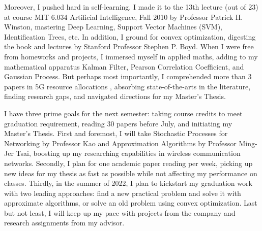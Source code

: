 \documentclass[12pt, a4paper, onside]{article}
\begin{document}
Moreover, I pushed hard in self-learning. I made it to the 13th lecture (out of 23) at course MIT 6.034 Artificial Intelligence, Fall 2010 by Professor Patrick H. Winston, mastering Deep Learning, Support Vector Machines (SVM), Identification Trees, etc. In addition, I ground for convex optimization, digesting the book and lectures by Stanford Professor Stephen P. Boyd. When I were free from homeworks and projects, I immersed myself in applied maths, adding to my mathematical apparatus Kalman Filter, Pearson Correlation Coefficient, and Gaussian Process. But perhaps most importantly, I comprehended more than 3 papers in 5G resource allocations \cite{5gJointThreshold, 5gJointACM, 5gQoS, 5gNoma}, absorbing state-of-the-arts in the literature, finding research gaps, and navigated directions for my Master's Thesis.

I have three prime goals for the next semester: taking course credits to meet graduation requirement, reading 30 papers before July, and initiating my Master's Thesis. First and foremost, I will take Stochastic Processes for Networking by Professor Kao and Approximation Algorithms by Professor Ming-Jer Tsai, boosting up my researching capabilities in wireless communication networks. Secondly, I plan for one academic paper reading per week, picking up new ideas for my thesis as fast as possible while not affecting my performance on classes. Thirdly, in the summer of 2022, I plan to kickstart my graduation work with two leading approaches: find a new practical problem and solve it with approximate algorithms, or solve an old problem using convex optimization. Last but not least, I will keep up my pace with projects from the company and research assignments from my advisor.

\printbibliography
\end{document}

